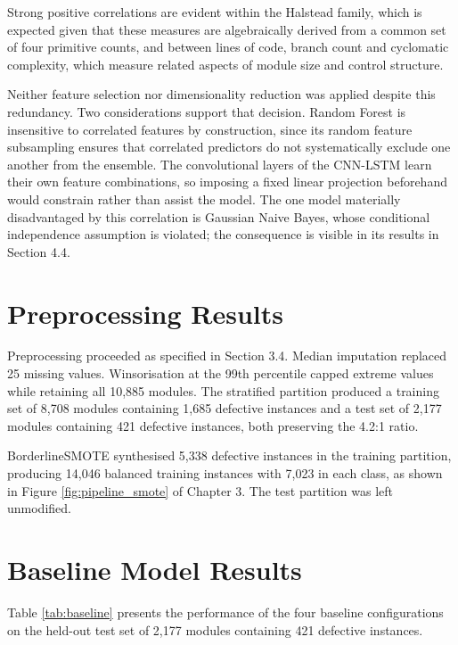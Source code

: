 \documentclass[12pt,a4paper,oneside]{report}
\begin{document}
Strong positive correlations are evident within the Halstead family, which is expected given that these measures are algebraically derived from a common set of four primitive counts, and between lines of code, branch count and cyclomatic complexity, which measure related aspects of module size and control structure.

Neither feature selection nor dimensionality reduction was applied despite this redundancy. Two considerations support that decision. Random Forest is insensitive to correlated features by construction, since its random feature subsampling ensures that correlated predictors do not systematically exclude one another from the ensemble. The convolutional layers of the CNN-LSTM learn their own feature combinations, so imposing a fixed linear projection beforehand would constrain rather than assist the model. The one model materially disadvantaged by this correlation is Gaussian Naive Bayes, whose conditional independence assumption is violated; the consequence is visible in its results in Section 4.4.

\section{Preprocessing Results}

Preprocessing proceeded as specified in Section 3.4. Median imputation replaced 25 missing values. Winsorisation at the 99th percentile capped extreme values while retaining all 10,885 modules. The stratified partition produced a training set of 8,708 modules containing 1,685 defective instances and a test set of 2,177 modules containing 421 defective instances, both preserving the 4.2:1 ratio.

BorderlineSMOTE synthesised 5,338 defective instances in the training partition, producing 14,046 balanced training instances with 7,023 in each class, as shown in Figure \ref{fig:pipeline_smote} of Chapter 3. The test partition was left unmodified.

\section{Baseline Model Results}

Table \ref{tab:baseline} presents the performance of the four baseline configurations on the held-out test set of 2,177 modules containing 421 defective instances.
\end{document}
